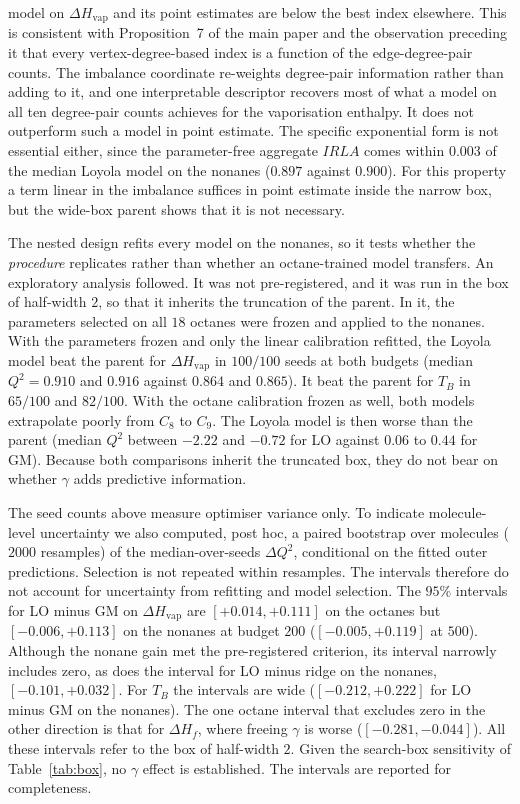 \documentclass[a5paper, 10pt]{article}
\theoremstyle{plain}
\theoremstyle{remark}
\theoremstyle{definition}
\begin{document}
model on $\Delta H_{\mathrm{vap}}$ and its point estimates are below the
best index elsewhere. This is consistent with Proposition~7 of the main paper and the observation preceding it that every vertex-degree-based index is a function of the edge-degree-pair counts. The imbalance coordinate re-weights degree-pair
information rather than adding to it, and one interpretable descriptor
recovers most of what a model on all ten degree-pair counts achieves
for the vaporisation enthalpy. It does not outperform such a model in
point estimate. The
specific exponential form is not essential either, since the
parameter-free aggregate $IRLA$ comes within $0.003$ of the median
Loyola model on the nonanes ($0.897$ against $0.900$). For this
property a term linear in the imbalance suffices in point estimate inside
the narrow box, but the wide-box parent shows that it is not necessary.

The nested design refits every model on the nonanes, so it tests
whether the \emph{procedure} replicates rather than whether an
octane-trained model transfers. An exploratory analysis
followed. It was not pre-registered, and it was run in the box of
half-width $2$, so that it inherits the truncation of the parent. In
it, the parameters selected on all $18$ octanes were frozen and applied
to the nonanes. With the parameters frozen and only the linear
calibration refitted, the Loyola model beat the parent for
$\Delta H_{\mathrm{vap}}$ in $100/100$ seeds at both budgets (median
$Q^2 = 0.910$ and $0.916$ against $0.864$ and $0.865$). It beat the
parent for $T_B$ in $65/100$ and $82/100$. With the octane calibration
frozen as well, both models extrapolate poorly from $C_8$ to $C_9$. The
Loyola model is then worse than the parent (median $Q^2$ between
$-2.22$ and $-0.72$ for LO against $0.06$ to $0.44$ for GM). Because
both comparisons inherit the truncated box, they do not bear on whether
$\gamma$ adds predictive information.

The seed counts above measure optimiser variance only. To indicate
molecule-level uncertainty we also computed, post hoc, a paired
bootstrap over molecules ($2000$ resamples) of the median-over-seeds
$\Delta Q^2$, conditional on the fitted outer predictions. Selection is
not repeated within resamples. The intervals therefore do not account
for uncertainty from refitting and model selection. The $95\%$ intervals
for LO minus GM on $\Delta H_{\mathrm{vap}}$ are $[+0.014, +0.111]$ on
the octanes but $[-0.006, +0.113]$ on the nonanes at budget $200$
($[-0.005, +0.119]$ at $500$). Although the nonane gain met the
pre-registered criterion, its interval narrowly includes zero, as does
the interval for LO minus ridge on the nonanes, $[-0.101, +0.032]$.
For $T_B$ the intervals are wide ($[-0.212, +0.222]$ for LO minus GM on
the nonanes). The one octane interval that excludes zero in the other
direction is that for $\Delta H_f$, where freeing $\gamma$ is worse
($[-0.281, -0.044]$). All these intervals refer to the box of
half-width $2$. Given the search-box sensitivity of Table~\ref{tab:box}, no $\gamma$ effect
is established. The intervals are reported for
completeness.
\end{document}
